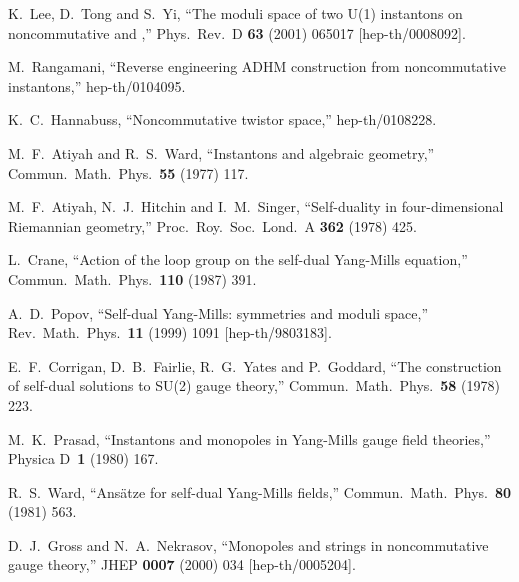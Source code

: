 \documentclass[a4paper,11pt]{article}
\numberwithin{equation}{section}
\providecommand{\R}{\mathbb R}
\begin{document}
{\begin{thebibliography}{99}
K.~Lee, D.~Tong and S.~Yi,
``The moduli space of two U(1) instantons on 
  noncommutative \myHighlight{$\R^4$}\coordHE{} and \myHighlight{$\R^3\times S^1$}\coordHE{},''
Phys.\ Rev.\ D {\bf 63} (2001) 065017
[hep-th/0008092].

M.~Rangamani,
``Reverse engineering ADHM construction from noncommutative instantons,''
hep-th/0104095.

K.~C.~Hannabuss,
``Noncommutative twistor space,''
hep-th/0108228.

M.~F.~Atiyah and R.~S.~Ward,
``Instantons and algebraic geometry,''\\
Commun.\ Math.\ Phys.\  {\bf 55} (1977) 117.

M.~F.~Atiyah, N.~J.~Hitchin and I.~M.~Singer,
``Self-duality in four-dimensional Riemannian geometry,''
Proc.\ Roy.\ Soc.\ Lond.\ A {\bf 362} (1978) 425.

L.~Crane,
``Action of the loop group on the self-dual Yang-Mills equation,''\\
Commun.\ Math.\ Phys.\  {\bf 110} (1987) 391.

A.~D.~Popov,
``Self-dual Yang-Mills: symmetries and moduli space,''\\
Rev.\ Math.\ Phys.\  {\bf 11} (1999) 1091
[hep-th/9803183].

E.~F.~Corrigan, D.~B.~Fairlie, R.~G.~Yates and P.~Goddard,
``The construction of self-dual solutions to SU(2) gauge theory,''
Commun.\ Math.\ Phys.\  {\bf 58} (1978) 223.

M.~K.~Prasad,
``Instantons and monopoles in Yang-Mills gauge field theories,''\\
Physica D~{\bf 1} (1980) 167.

R.~S.~Ward,
``Ans\"atze for self-dual Yang-Mills fields,''
Commun.\ Math.\ Phys.\  {\bf 80} (1981) 563.

D.~J.~Gross and N.~A.~Nekrasov,
``Monopoles and strings in noncommutative gauge theory,''
JHEP {\bf 0007} (2000) 034
[hep-th/0005204].


\end{thebibliography}}
\end{document}
